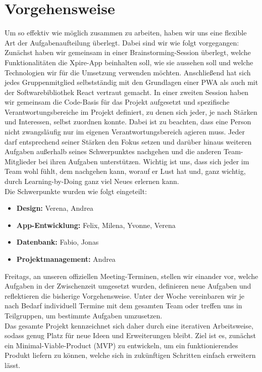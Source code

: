 \section{Vorgehensweise}
Um so effektiv wie möglich zusammen zu arbeiten, haben wir uns eine flexible Art der Aufgabenaufteilung überlegt. Dabei sind wir wie folgt vorgegangen: Zunächst haben wir gemeinsam in einer Brainstorming-Session überlegt, welche Funktionalitäten die Xpire-App beinhalten soll, wie sie aussehen soll und welche Technologien wir für die Umsetzung verwenden möchten. Anschließend hat sich jedes Gruppenmitglied selbstständig mit den Grundlagen einer PWA als auch mit der Softwarebibliothek React vertraut gemacht. In einer zweiten Session haben wir gemeinsam die Code-Basis für das Projekt aufgesetzt und spezifische Verantwortungsbereiche im Projekt definiert, zu denen sich jeder, je nach Stärken und Interessen, selbst zuordnen konnte. Dabei ist zu beachten, dass eine Person nicht zwangsläufig nur im eigenen Verantwortungsbereich agieren muss. Jeder darf entsprechend seiner Stärken den Fokus setzen und darüber hinaus weiteren Aufgaben außerhalb seines Schwerpunktes nachgehen und die anderen Team-Mitglieder bei ihren Aufgaben unterstützen. Wichtig ist uns, dass sich jeder im Team wohl fühlt, dem nachgehen kann, worauf er Lust hat und, ganz wichtig, durch Learning-by-Doing ganz viel Neues erlernen kann.\\
Die Schwerpunkte wurden wie folgt eingeteilt:
\begin{itemize}[noitemsep]
	\item \textbf{Design:} Verena, Andrea
	\item \textbf{App-Entwicklung:} Felix, Milena, Yvonne, Verena
	\item \textbf{Datenbank:} Fabio, Jonas
	\item \textbf{Projektmanagement:} Andrea
\end{itemize}
Freitags, an unseren offiziellen Meeting-Terminen, stellen wir einander vor, welche Aufgaben in der Zwischenzeit umgesetzt wurden, definieren neue Aufgaben und reflektieren die bisherige Vorgehensweise. Unter der Woche vereinbaren wir je nach Bedarf individuell Termine mit dem gesamten Team oder treffen uns in Teilgruppen, um bestimmte Aufgaben umzusetzen.\\
Das gesamte Projekt kennzeichnet sich daher durch eine iterativen Arbeitsweise, sodass genug Platz für neue Ideen und Erweiterungen bleibt. Ziel ist es, zunächst ein Minimal-Viable-Product (MVP) zu entwickeln, um ein funktionierendes Produkt liefern zu können, welche sich in zukünftigen Schritten einfach erweitern lässt.


